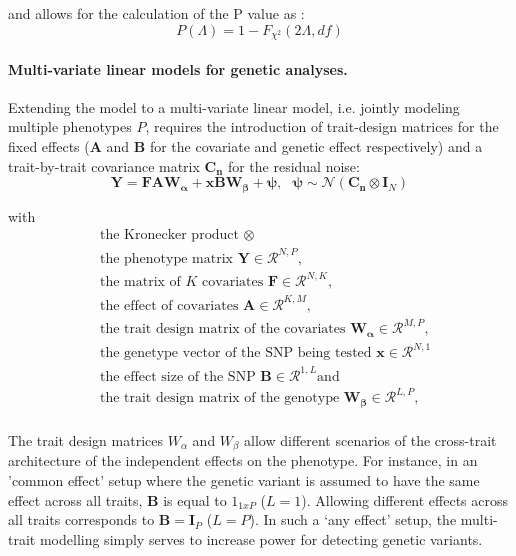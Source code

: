 \noindent and allows for the calculation of the P value as :
\begin{equation}
P(\Lambda) = 1 - F_{\chi^2}(2\Lambda, df)
\label{eq:pvalue}
\end{equation}

\paragraph{Multi-variate linear models for genetic analyses.} Extending the model to a multi-variate linear model, i.e. jointly modeling multiple phenotypes \(P\), requires the introduction of trait-design matrices for the fixed effects (\(\mathbf{A}\) and \(\mathbf{B}\) for the covariate and genetic effect respectively) and a trait-by-trait covariance matrix \(\mathbf{C_n}\) for the residual noise:
\begin{equation}
\mathbf{Y} = \mathbf{F}\mathbf{A}\mathbf{W_\alpha} + \mathbf{x}\mathbf{B}\mathbf{W_\beta} + \boldsymbol{\psi},\text{ }
\boldsymbol{\psi}\sim\mathcal{N}\left(\mathbf{C_n} \otimes \mathbf{I}_N\right)
\label{eq:lm-mv}
\end{equation}

with
\begin{align*} 
& \text{the Kronecker product } \otimes \\
& \text{the phenotype matrix } \mathbf{Y} \in \mathcal{R}^{N,P},\\
& \text{the matrix of $K$ covariates } \mathbf{F} \in \mathcal{R}^{N,K},\\
& \text{the effect of covariates } \boldsymbol{A} \in \mathcal{R}^{K,M},\\
& \text{the trait design matrix of the covariates } \mathbf{W_\alpha} \in \mathcal{R}^{M,P},\\
& \text{the genetype vector of the SNP being tested } \mathbf{x} \in \mathcal{R}^{N,1}\\
& \text{the effect size of the SNP } \boldsymbol{B} \in \mathcal{R}^{1, L} \text{and}\\
& \text{the trait design matrix of the genotype } \mathbf{W_\beta} \in \mathcal{R}^{L,P},\\
\end{align*} 

The trait design matrices \(W_\alpha\) and \(W_\beta\) allow different scenarios of the cross-trait architecture of the independent effects on the phenotype.  For instance, in an 'common effect' setup where the genetic variant is assumed to have the same effect across all traits,  \( \boldsymbol{B}\) is equal to \(1_{1xP}\) (\(L=1\)). Allowing different effects across all traits corresponds to  \( \boldsymbol{B} =  \boldsymbol{I}_{P} \) (\(L=P\)). In such a `any effect' setup, the multi-trait modelling simply serves to increase power for detecting genetic variants. 

